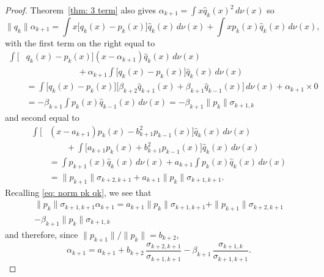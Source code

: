 \documentclass[12pt,a4paper]{article}
\begin{document}
\begin{proof}
Theorem~\ref{thm: 3 term} also gives
$\alpha_{k+1}=\int x\hat q_k(x)^2\,d\nu(x)$ so
\[
\|q_k\|\alpha_{k+1}=\int x\bigl[q_k(x)-p_k(x)\bigr]
	\hat q_k(x)\,d\nu(x)+\int xp_k(x)\hat q_k(x)\,d\nu(x),
\]
with the first term on the right equal to
\begin{align*}
\int\bigl[&q_k(x)-p_k(x)\bigr](x-\alpha_{k+1})
	\hat q_k(x)\,d\nu(x)\\
	&\qquad\qquad\qquad{}
	+\alpha_{k+1}\int 
		\bigl[q_k(x)-p_k(x)\bigr]\hat q_k(x)\,d\nu(x)\\
	&=\int\bigl[q_k(x)-p_k(x)\bigr]
	\bigl[\beta_{k+2}\hat q_{k+1}(x)
		+\beta_{k+1}\hat q_{k-1}(x)\bigr] 
		\,d\nu(x)+\alpha_{k+1}\times0\\
	&=-\beta_{k+1}\int p_k(x)\hat q_{k-1}(x)\,d\nu(x)
	=-\beta_{k+1}\|p_k\|\sigma_{k+1,k}
\end{align*}
and second equal to
\begin{align*}
\int\bigl[
	&(x-a_{k+1})p_k(x)-b_{k+1}^2p_{k-1}(x)\bigr]\hat q_k(x)\,d\nu(x)\\
	&\qquad{}+\int\bigl[
		a_{k+1}p_k(x)+b_{k+1}^2p_{k-1}(x)\bigr]\hat q_k(x)\,d\nu(x)\\
	&=\int p_{k+1}(x)\hat q_k(x)\,d\nu(x)
		+a_{k+1}\int p_k(x)\hat q_k(x)\,d\nu(x)\\
	&=\|p_{k+1}\|\sigma_{k+2,k+1}+a_{k+1}\|p_k\|\sigma_{k+1,k+1}.
\end{align*}
Recalling \eqref{eq: norm pk qk}, we see that
\begin{multline*}
\|p_k\|\sigma_{k+1,k+1}\alpha_{k+1}
	=a_{k+1}\|p_k\|\sigma_{k+1,k+1}+\|p_{k+1}\|\sigma_{k+2,k+1}\\
		-\beta_{k+1}\|p_k\|\sigma_{k+1,k}
\end{multline*}
and therefore, since $\|p_{k+1}\|/\|p_k\|=b_{k+2}$,
\[
\alpha_{k+1}=a_{k+1}+b_{k+2}\,
	\frac{\sigma_{k+2,k+1}}{\sigma_{k+1,k+1}}
	-\beta_{k+1}\,\frac{\sigma_{k+1,k}}{\sigma_{k+1,k+1}}.
\]
\end{proof}
\end{document}
